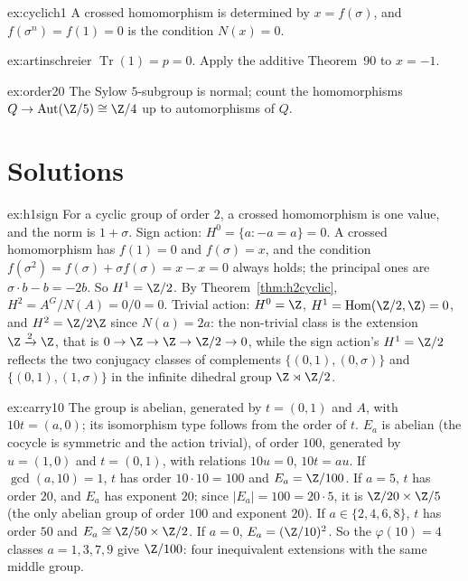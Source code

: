 \begin{hint}{ex:cyclich1}
A crossed homomorphism is determined by $x=f(\sigma)$, and $f(\sigma^n)=f(1)=0$ is the condition $N(x)=0$.
\end{hint}

\begin{hint}{ex:artinschreier}
$\operatorname{Tr}(1)=p=0$. Apply the additive Theorem~90 to $x=-1$.
\end{hint}

\begin{hint}{ex:order20}
The Sylow $5$-subgroup is normal; count the homomorphisms $Q\to\operatorname{Aut}(\Z/5)\cong\Z/4$ up to automorphisms of $Q$.
\end{hint}

\section{Solutions}

\begin{solution}{ex:h1sign}
\idea For a cyclic group of order $2$, a crossed homomorphism is one value, and the norm is $1+\sigma$.
\writeup Sign action: $H^0=\{a:-a=a\}=0$. A crossed homomorphism has $f(1)=0$ and $f(\sigma)=x$, and the condition $f(\sigma^2)=f(\sigma)+\sigma f(\sigma)=x-x=0$ always holds; the principal ones are $\sigma\cdot b-b=-2b$. So
$H^1=\Z/2$. By Theorem~\ref{thm:h2cyclic}, $H^2=A^G/N(A)=0/0=0$. Trivial action: $H^0=\Z$, $H^1=\operatorname{Hom}(\Z/2,\Z)=0$, and $H^2=\Z/2\Z$ since $N(a)=2a$: the non-trivial class is the extension $\Z\xrightarrow2\Z$, that is
$0\to\Z\to\Z\to\Z/2\to0$, while the sign action's $H^1=\Z/2$ reflects the two conjugacy classes of complements $\{(0,1),(0,\sigma)\}$ and $\{(0,1),(1,\sigma)\}$ in the infinite dihedral group $\Z\rtimes\Z/2$.
\end{solution}

\begin{solution}{ex:carry10}
\idea The group is abelian, generated by $t=(0,1)$ and $A$, with $10t=(a,0)$; its isomorphism type follows from the order of $t$.
\writeup $E_a$ is abelian (the cocycle is symmetric and the action trivial), of order $100$, generated by $u=(1,0)$ and $t=(0,1)$, with relations $10u=0$, $10t=au$. If $\gcd(a,10)=1$, $t$ has order $10\cdot10=100$ and $E_a=\Z/100$. If $a=5$,
$t$ has order $20$, and $E_a$ has exponent $20$; since $|E_a|=100=20\cdot5$, it is $\Z/20\times\Z/5$ (the only abelian group of order $100$ and exponent $20$). If $a\in\{2,4,6,8\}$, $t$ has order $50$ and $E_a\cong\Z/50\times\Z/2$. If $a=0$,
$E_a=(\Z/10)^2$. So the $\varphi(10)=4$ classes $a=1,3,7,9$ give $\Z/100$: four inequivalent extensions with the same middle group.
\end{solution}

